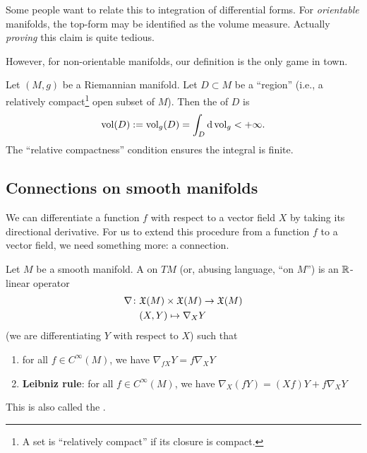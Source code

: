 \begin{remark}
Some people want to relate this to integration of differential
forms. For \emph{orientable} manifolds, the top-form may be identified
as the volume measure. Actually \emph{proving} this claim is quite
tedious.

However, for non-orientable manifolds, our definition is the only game
in town.
\end{remark}

\begin{definition}
Let $(M,g)$ be a Riemannian manifold. Let $D\subset M$ be a ``region''
(i.e., a relatively compact\footnote{A set is ``relatively compact''
if its closure is compact.} open subset of $M$). Then the
 of $D$ is
\begin{equation}
\operatorname{vol}(D):=\operatorname{vol}_{g}(D)=\int_{D}\mathrm{d}\operatorname{vol}_{g}<+\infty.
\end{equation}
The ``relative compactness'' condition ensures the integral is finite.
\end{definition}

\subsection{Connections on smooth manifolds}

\begin{node}
We can differentiate a function $f$ with respect to a vector field $X$
by taking its directional derivative. For us to extend this procedure
from a function $f$ to a vector field, we need something more: a connection.
\end{node}

\begin{definition}
Let $M$ be a smooth manifold. A  on $TM$ (or,
abusing language, ``on $M$'') is an $\mathbb{R}$-linear operator
\begin{equation}
\begin{split}
\nabla\colon&\mathfrak{X}(M)\times\mathfrak{X}(M)\to\mathfrak{X}(M)\\
&(X,Y)\mapsto\nabla_{X}Y
\end{split}
\end{equation}
(we are differentiating $Y$ with respect to $X$) such that
\begin{enumerate}
\item for all $f\in C^{\infty}(M)$, we have $\nabla_{fX}Y=f\nabla_{X}Y$
\item \textbf{Leibniz rule}: for all $f\in C^{\infty}(M)$, we have $\nabla_{X}(fY)=(Xf)Y+f\nabla_{X}Y$
\end{enumerate}
This is also called the .
\end{definition}

